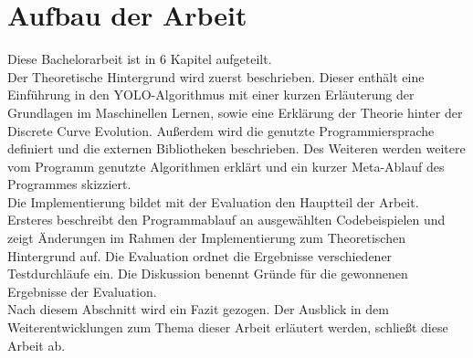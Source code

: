 \section{Aufbau der Arbeit} 
{Diese Bachelorarbeit ist in 6 Kapitel aufgeteilt. \\ 
Der Theoretische Hintergrund wird zuerst beschrieben. Dieser enthält eine Einführung in den YOLO-Algorithmus mit einer kurzen Erläuterung der Grundlagen im Maschinellen Lernen, sowie eine Erklärung der Theorie hinter der Discrete Curve Evolution. Außerdem wird die genutzte Programmiersprache definiert und die externen Bibliotheken beschrieben. Des Weiteren werden weitere vom Programm genutzte Algorithmen erklärt und ein kurzer Meta-Ablauf des Programmes skizziert. \\
Die Implementierung bildet mit der Evaluation den Hauptteil der Arbeit. Ersteres beschreibt den Programmablauf an ausgewählten Codebeispielen und zeigt Änderungen im Rahmen der Implementierung zum Theoretischen Hintergrund auf. Die Evaluation ordnet die Ergebnisse verschiedener Testdurchläufe ein. Die Diskussion benennt Gründe für die gewonnenen Ergebnisse der Evaluation. \\
Nach diesem Abschnitt wird ein Fazit gezogen. Der Ausblick in dem Weiterentwicklungen zum Thema dieser Arbeit erläutert werden, schließt diese Arbeit ab.

}
